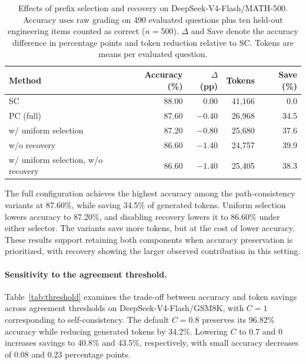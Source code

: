 \begin{table}[htbp]
\centering\small
\caption{Effects of prefix selection and recovery on DeepSeek-V4-Flash/MATH-500. Accuracy uses raw grading on 490 evaluated questions plus ten held-out engineering items counted as correct ($n=500$). $\Delta$ and Save denote the accuracy difference in percentage points and token reduction relative to SC. Tokens are means per evaluated question.}
\label{tab:selrec}
\begin{tabular}{lrrrr}
\toprule
Method & Accuracy (\%) & $\Delta$ (pp) & Tokens & Save (\%)\\
\midrule
SC & 88.00 & 0.00 & 41,166 & 0.0 \\
\midrule
PC (full) & 87.60 & $-0.40$ & 26,968 & 34.5 \\
\quad w/ uniform selection & 87.20 & $-0.80$ & 25,680 & 37.6 \\
\quad w/o recovery & 86.60 & $-1.40$ & 24,757 & 39.9 \\
\quad w/ uniform selection, w/o recovery & 86.60 & $-1.40$ & 25,405 & 38.3 \\
\bottomrule
\end{tabular}
\end{table}

The full configuration achieves the highest accuracy among the path-consistency variants at 87.60\%, while saving 34.5\% of generated tokens. Uniform selection lowers accuracy to 87.20\%, and disabling recovery lowers it to 86.60\% under either selector. The variants save more tokens, but at the cost of lower accuracy. These results support retaining both components when accuracy preservation is prioritized, with recovery showing the larger observed contribution in this setting.

\paragraph{Sensitivity to the agreement threshold.}
Table~\ref{tab:threshold} examines the trade-off between accuracy and token savings across agreement thresholds on DeepSeek-V4-Flash/GSM8K, with $C=1$ corresponding to self-consistency. The default $C=0.8$ preserves its 96.82\% accuracy while reducing generated tokens by 34.2\%. Lowering $C$ to 0.7 and 0 increases savings to 40.8\% and 43.5\%, respectively, with small accuracy decreases of 0.08 and 0.23 percentage points.

